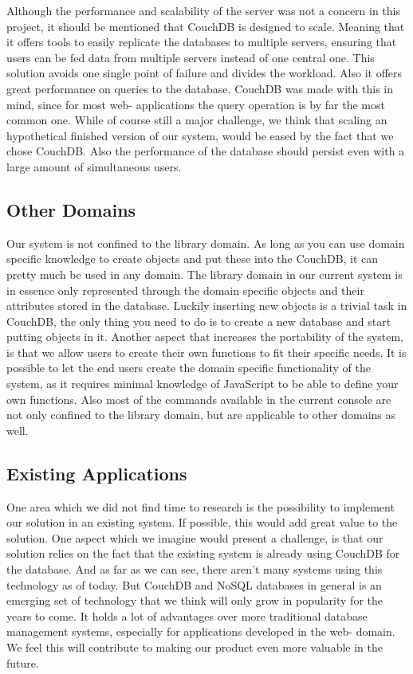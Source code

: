 Although the performance and scalability of the server was not a concern in this project, it should be mentioned that CouchDB is designed to scale. Meaning that it offers tools to easily replicate the databases to multiple servers, ensuring that users can be fed data from multiple servers instead of one central one. This solution avoids one single point of failure and divides the workload. Also it offers great performance on queries to the database. CouchDB was made with this in mind, since for most web- applications the query operation is by far the most common one. While of course still a major challenge, we think that scaling an hypothetical finished version of our system, would be eased by the fact that we chose CouchDB. Also the performance of the database should persist even with a large amount of simultaneous users.

\subsection{Other Domains}
Our system is not confined to the library domain. As long as you can use domain specific knowledge to create objects and put these into the CouchDB, it can pretty much be used in any domain. The library domain in our current system is in essence only represented through the domain specific objects and their attributes stored in the database. Luckily inserting new objects is a trivial task in CouchDB, the only thing you need to do is to create a new database and start putting objects in it. Another aspect that increases the portability of the system, is that we allow users to create their own functions to fit their specific needs. It is possible to let the end users create the domain specific functionality of the system, as it requires minimal knowledge of JavaScript to be able to define your own functions. Also most of the commands available in the current console are not only confined to the library domain, but are applicable to other domains as well. 

\subsection{Existing Applications}
One area which we did not find time to research is the possibility to implement our solution in an existing system. If possible, this would add great value to the solution. One aspect which we  imagine would present a challenge, is that our solution relies on the fact that the existing system is already using CouchDB for the database. And as far as we can see, there aren’t many systems using this technology as of today. But CouchDB and NoSQL databases in general is an emerging set of technology that we think will only grow in popularity for the years to come. It holds a lot of advantages over more traditional database management systems, especially for applications developed in the web- domain. We feel this will contribute to making our product even more valuable in the future.

